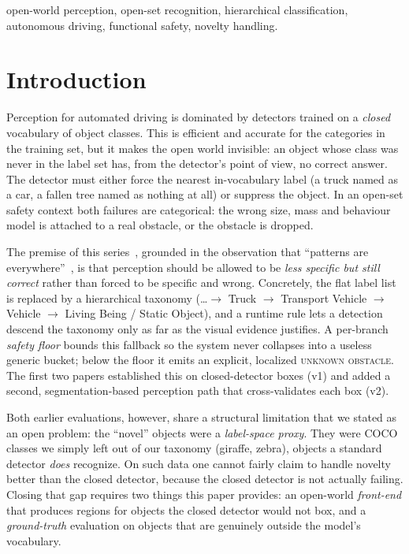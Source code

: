 \documentclass[conference]{IEEEtran}
\begin{document}
\begin{IEEEkeywords}
open-world perception, open-set recognition, hierarchical classification,
autonomous driving, functional safety, novelty handling.
\end{IEEEkeywords}

\section{Introduction}
Perception for automated driving is dominated by detectors trained on a
\emph{closed} vocabulary of object classes. This is efficient and accurate for the
categories in the training set, but it makes the open world invisible: an object
whose class was never in the label set has, from the detector's point of view, no
correct answer. The detector must either force the nearest in-vocabulary label (a
truck named as a car, a fallen tree named as nothing at all) or suppress the
object. In an open-set safety context both failures are categorical: the wrong
size, mass and behaviour model is attached to a real obstacle, or the obstacle is
dropped.

The premise of this series~\cite{schaller2025}, grounded in the observation that
``patterns are everywhere''~\cite{schaller_patterns}, is that perception should be
allowed to be \emph{less specific but still correct} rather than forced to be
specific and wrong. Concretely, the flat label list is replaced by a hierarchical
taxonomy (\dots{}$\to$ Truck $\to$ Transport Vehicle $\to$ Vehicle $\to$ Living
Being / Static Object), and a runtime rule lets a detection descend the taxonomy
only as far as the visual evidence justifies. A per-branch \emph{safety floor}
bounds this fallback so the system never collapses into a useless generic bucket;
below the floor it emits an explicit, localized \textsc{unknown obstacle}. The
first two papers established this on closed-detector boxes (v1) and added a second,
segmentation-based perception path that cross-validates each box (v2).

Both earlier evaluations, however, share a structural limitation that we stated as
an open problem: the ``novel'' objects were a \emph{label-space proxy}. They were
COCO classes we simply left out of our taxonomy (giraffe, zebra), objects a
standard detector \emph{does} recognize. On such data one cannot fairly claim to
handle novelty better than the closed detector, because the closed detector is not
actually failing. Closing that gap requires two things this paper provides: an
open-world \emph{front-end} that produces regions for objects the closed detector
would not box, and a \emph{ground-truth} evaluation on objects that are genuinely
outside the model's vocabulary.
\end{document}
